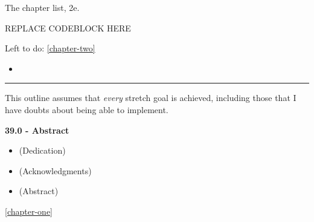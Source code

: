 The chapter list, 2e.

REPLACE CODEBLOCK HERE

Left to do: \autoref{chapter-two}

\begin{itemize}
\tightlist
\item
\end{itemize}

\begin{center}\rule{0.5\linewidth}{0.5pt}\end{center}

This outline assumes that \emph{every} stretch goal is achieved,
including those that I have doubts about being able to implement.

\textbf{39.0 - Abstract}

\begin{itemize}
\tightlist
\item
  (Dedication)
\item
  (Acknowledgments)
\item
  (Abstract)
\end{itemize}

\autoref{chapter-one}

